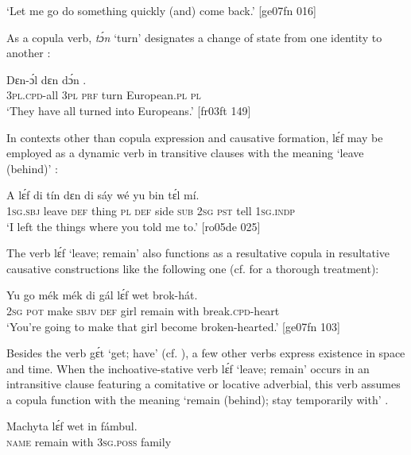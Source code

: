 \glt ‘Let me go do something quickly (and) come back.’ [ge07fn 016]
\z

As a copula verb, \textit{tɔ́n} ‘turn’ designates a change of state from one identity to another :


\ea%
    \label{ex:key:798}
    \gll Dɛn-ɔ́l    dɛn  dɔ́n        .\\
\textsc{3pl.cpd-}all  \textsc{3pl}  \textsc{prf}  turn    European.\textsc{pl}  \textsc{pl}\\

\glt ‘They have all turned into Europeans.’ [fr03ft 149]
\z

In contexts other than copula expression and causative formation, lɛ́f may be employed as a dynamic verb in transitive clauses with the meaning ‘leave (behind)’ : 


\ea%
    \label{ex:key:799}
    \gll A    lɛ́f    di  tín    dɛn  di  sáy  wé  yu  bin  tɛ́l  mí.\\
\textsc{1sg.sbj}  leave  \textsc{def}  thing  \textsc{pl}  \textsc{def}  side  \textsc{sub}  \textsc{2sg}  \textsc{pst}  tell  \textsc{1sg.indp}\\

\glt ‘I left the things where you told me to.’ [ro05de 025]
\z

The verb lɛ́f ‘leave; remain’ also functions as a resultative copula{\fff} in resultative causative constructions {\fff}like the following one (cf.  for a thorough treatment){\fff}: 


\ea%
    \label{ex:key:800}
    \gll Yu  go  mék    mék  di  gál  lɛ́f    wet    brok-hát.\\
\textsc{2sg}  \textsc{pot}  make  \textsc{sbjv}  \textsc{def}  girl  remain  with    break.\textsc{cpd}{}-heart\\

\glt ‘You’re going to make that girl become broken-hearted.’ [ge07fn 103]
\z

Besides the verb gɛ́t ‘get; have’ (cf. ), a few other verbs express existence in space and time. When the inchoative-stative verb lɛ́f ‘leave; remain’ occurs in an intransitive clause featuring a comitative or locative adverbial, this verb assumes a copula function with the meaning ‘remain (behind); stay temporarily with’ . 


\ea%
    \label{ex:key:801}
    \gll Machyta    lɛ́f    wet    in    fámbul.\\
\textsc{name}    remain  with    \textsc{3sg.poss}  family\\

